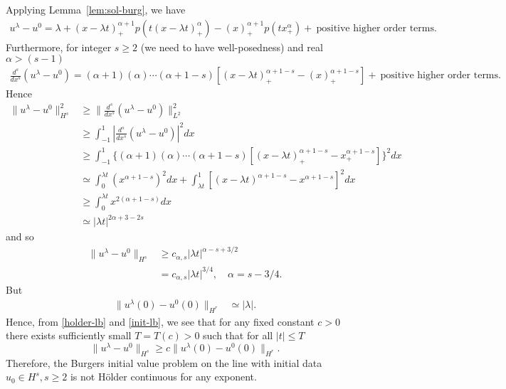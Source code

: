 \documentclass[12pt,reqno]{amsart}
\numberwithin{equation}{section}  %
\numberwithin{figure}{section}
\begin{document}
%
%
Applying Lemma~\ref{lem:sol-burg}, we have
%
%
\begin{equation*}
\begin{split}
u^{\lambda} - u^{0} = \lambda + (x - \lambda t)^{\alpha + 1}_{+}p(t(x- \lambda t)^{\alpha}_{+}) - (x)_{+}^{\alpha + 1}p(tx_{+}^{\alpha}) + \ \text{positive higher order terms}.
\end{split}
\end{equation*}
%
%
Furthermore, for integer $s \ge 2$ (we need to have well-posedness) and real $\alpha > (s-1)$
%
%
\begin{equation*}
\begin{split}
\frac{d^{s}}{dx^{s}}(u^{\lambda} - u^{0}) = (\alpha + 1)(\alpha) \cdots (\alpha + 1 -s)[(x - \lambda t)^{\alpha + 1 -s}_{+} - (x)_{+}^{\alpha + 1 -s}] + \ \text{positive higher order terms}.
\end{split}
\end{equation*}
%
%
Hence
%
%
\begin{equation*}
\begin{split}
\| u^{\lambda} - u^{0} \|_{H^{s}}^{2} 
& \ge \| \frac{d^{s}}{dx^{s}}(u^{\lambda} - u^{0}) \|_{L^{2}}^{2}
\\
& \ge \int_{-1}^{1} | \frac{d^{s}}{dx^{s}}(u^{\lambda} - u^{0}) |^{2} dx
\\
& \ge \int_{-1}^{1} \{(\alpha + 1)(\alpha) \cdots (\alpha + 1 -s   )[(x - \lambda t)_{+}^{\alpha + 1 -s} - x_{+}^{\alpha + 1 -s}]\}^{2} dx
\\
& \simeq \int_{0}^{\lambda t} (x^{\alpha + 1 -s})^{2} dx + \int_{\lambda t}^{1} [(x - \lambda t)^{\alpha +1 -s} -x^{\alpha + 1 -s}]^{2} dx
\\
& \ge \int_{0}^{\lambda t} x^{2(\alpha + 1 -s)} dx 
\\
& \simeq  | \lambda t |^{2 \alpha + 3 -2s}
\end{split}
\end{equation*}
%
%
and so
\begin{equation}
    \begin{split}
    \label{holder-lb}
\| u^{\lambda} - u^{0} \|_{H^{s}} & \ge c_{\alpha, s} | \lambda t |^{\alpha -s + 3/2}
\\
&  = c_{\alpha, s} | \lambda t |^{3/4}, \quad \alpha = s - 3/4.
\end{split}
\end{equation}
But
%
%
\begin{equation}
    \label{init-lb}
\begin{split}
    \| u^{\lambda}(0) - u^{0}(0) \|_{H^{r}} 
    & \simeq |\lambda |.
\end{split}
\end{equation}
%
Hence, from \eqref{holder-lb} and \eqref{init-lb},
we see that for any fixed constant $c > 0$ there exists sufficiently small $T = T(c) >
0$ such that for all $|t| \le T$
%
\begin{equation*}
\| u^{\lambda} - u^{0} \|_{H^{s}} \ge c \| u^{\lambda}(0) - u^{0}(0) \|_{H^{r}}.
\end{equation*}
Therefore, the Burgers initial value problem on the line with initial data
$u_{0} \in H^{s}, s \ge 2$ is not H\"older continuous for any exponent.
%
%
%
%
%
%
%
%
\end{document}

